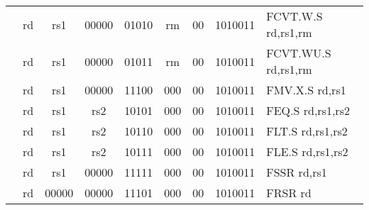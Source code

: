 \begin{table}[p]
\begin{small}
\begin{center}
\begin{tabular}{rccccccccccl}
&
\multicolumn{1}{|c|}{rd} &
\multicolumn{1}{c|}{rs1} &
\multicolumn{1}{c|}{00000} &
\multicolumn{3}{c|}{01010} &
\multicolumn{2}{c|}{rm} &
\multicolumn{1}{c|}{00} &
\multicolumn{1}{c|}{1010011} & FCVT.W.S rd,rs1,rm \\
\cline{2-11}
  

&
\multicolumn{1}{|c|}{rd} &
\multicolumn{1}{c|}{rs1} &
\multicolumn{1}{c|}{00000} &
\multicolumn{3}{c|}{01011} &
\multicolumn{2}{c|}{rm} &
\multicolumn{1}{c|}{00} &
\multicolumn{1}{c|}{1010011} & FCVT.WU.S rd,rs1,rm \\
\cline{2-11}
  

&
\multicolumn{1}{|c|}{rd} &
\multicolumn{1}{c|}{rs1} &
\multicolumn{1}{c|}{00000} &
\multicolumn{3}{c|}{11100} &
\multicolumn{2}{c|}{000} &
\multicolumn{1}{c|}{00} &
\multicolumn{1}{c|}{1010011} & FMV.X.S rd,rs1 \\
\cline{2-11}
  

&
\multicolumn{1}{|c|}{rd} &
\multicolumn{1}{c|}{rs1} &
\multicolumn{1}{c|}{rs2} &
\multicolumn{3}{c|}{10101} &
\multicolumn{2}{c|}{000} &
\multicolumn{1}{c|}{00} &
\multicolumn{1}{c|}{1010011} & FEQ.S rd,rs1,rs2 \\
\cline{2-11}
  

&
\multicolumn{1}{|c|}{rd} &
\multicolumn{1}{c|}{rs1} &
\multicolumn{1}{c|}{rs2} &
\multicolumn{3}{c|}{10110} &
\multicolumn{2}{c|}{000} &
\multicolumn{1}{c|}{00} &
\multicolumn{1}{c|}{1010011} & FLT.S rd,rs1,rs2 \\
\cline{2-11}
  

&
\multicolumn{1}{|c|}{rd} &
\multicolumn{1}{c|}{rs1} &
\multicolumn{1}{c|}{rs2} &
\multicolumn{3}{c|}{10111} &
\multicolumn{2}{c|}{000} &
\multicolumn{1}{c|}{00} &
\multicolumn{1}{c|}{1010011} & FLE.S rd,rs1,rs2 \\
\cline{2-11}
  

&
\multicolumn{1}{|c|}{rd} &
\multicolumn{1}{c|}{rs1} &
\multicolumn{1}{c|}{00000} &
\multicolumn{3}{c|}{11111} &
\multicolumn{2}{c|}{000} &
\multicolumn{1}{c|}{00} &
\multicolumn{1}{c|}{1010011} & FSSR rd,rs1 \\
\cline{2-11}
  

&
\multicolumn{1}{|c|}{rd} &
\multicolumn{1}{c|}{00000} &
\multicolumn{1}{c|}{00000} &
\multicolumn{3}{c|}{11101} &
\multicolumn{2}{c|}{000} &
\multicolumn{1}{c|}{00} &
\multicolumn{1}{c|}{1010011} & FRSR rd \\
\cline{2-11}
  

\end{tabular}
\end{center}
\end{small}

\label{instr-table}
\end{table}
  

